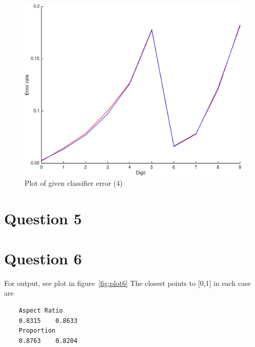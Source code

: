 \documentclass{article}
\begin{document}
\begin{figure}
\centering
\includegraphics[width=\textwidth]{plot4}
\caption{Plot of given classifier error (4)}
\label{fig:plot4}
\end{figure}


\pagebreak
\section*{Question 5}



\pagebreak
\section*{Question 6}

For output, see plot in figure~\ref{fig:plot6} The closest points to [0,1] in each case are
\begin{lstlisting}
    Aspect Ratio
    0.8315    0.8633
    Proportion
    0.8763    0.8204

\end{lstlisting}
\end{document}
